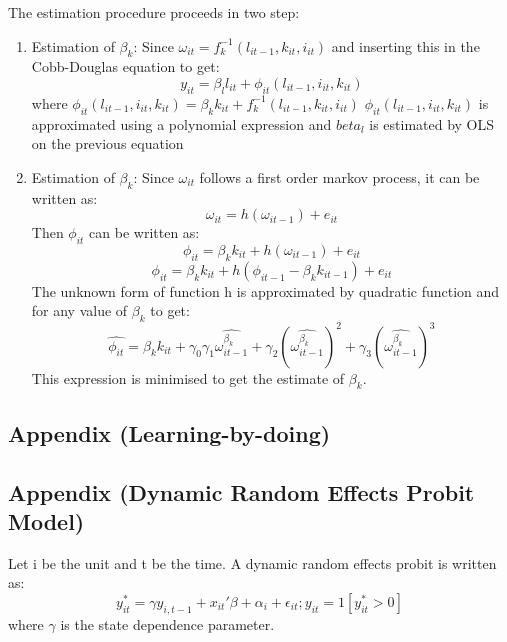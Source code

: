 \documentclass[12pt]{article}
\begin{document}
The estimation procedure proceeds in two step:
\begin{enumerate}
\item Estimation of $\beta_{k}$:
Since $\omega_{it}=f_{k}^{-1}(l_{it-1},k_{it},i_{it})$ and inserting
this in the Cobb-Douglas equation to get: 
$$ y_{it} = \beta_{l}l_{it} + \phi_{it}(l_{it-1},i_{it},k_{it})$$
where $\phi_{it}(l_{it-1},i_{it},k_{it}) =  \beta_{k}k_{it}+ f_{k}^{-1}(l_{it-1},k_{it},i_{it})$
$\phi_{it}(l_{it-1},i_{it},k_{it})$ is approximated using a polynomial
expression and $beta_{l}$ is estimated by  OLS on the previous
equation
\item Estimation of $\beta_{k}$:
Since $\omega_{it}$ follows a first order markov process, it can be
written as: 
$$ \omega_{it} = h(\omega_{it-1}) + e_{it}$$
Then $\phi_{it}$ can be written as: 
$$ \phi_{it} = \beta_{k}k_{it} + h(\omega_{it-1}) + e_{it}$$
$$ \phi_{it} = \beta_{k}k_{it} + h(\phi_{it-1}- \beta_{k}k_{it-1}) + e_{it}$$
The unknown form of function h is approximated by quadratic function
and for any value of $\beta_k$ to get:
$$ \hat{\phi_{it}} = \beta_{k}k_{it} +\gamma_{0}
\gamma_{1}\hat{\omega_{it-1}^{\beta_{k}}}+
\gamma_{2}(\hat{\omega_{it-1}^{\beta_{k}}})^{2}
+ \gamma_{3}(\hat{\omega_{it-1}^{\beta_{k}}})^{3} $$
 This expression is minimised to get the estimate of $\beta_{k}$. 
\end{enumerate}

\newpage
{}
\subsection{Appendix (Learning-by-doing)}\label{apendix:lbd}


 
\restoregeometry

 


\subsection{Appendix (Dynamic Random Effects Probit  Model)}\label{apendix:random}
Let i be the unit and t be the time. A dynamic random effects probit
is written as: 
$$ y_{it}^{*} = \gamma y_{i,t-1} + x_{it}'\beta + \alpha_{i} +
\epsilon_{it}; y_{it}=1[y_{it}^{*} > 0]$$
where $\gamma$ is the state dependence parameter.
\end{document}

